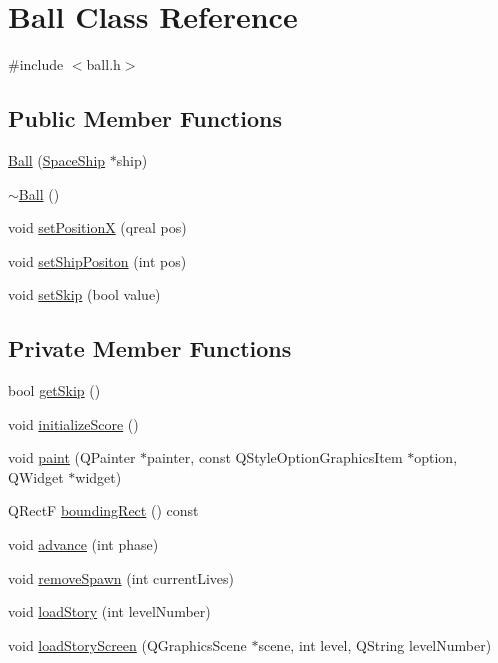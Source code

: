\hypertarget{class_ball}{
\section{Ball Class Reference}
\label{class_ball}
}


{\ttfamily \#include $<$ball.h$>$}\subsection*{Public Member Functions}
\begin{DoxyCompactItemize}
\item 
\hyperlink{class_ball_a30e61563c2285136d241396826967ca5}{Ball} (\hyperlink{class_space_ship}{SpaceShip} $\ast$ship)
\item 
\hyperlink{class_ball_a20f2f6ac0bf648f406a8e12e63429fcd}{$\sim$Ball} ()
\item 
void \hyperlink{class_ball_aacd6dd3f04beb5d6cb7b09b3b8b42dda}{setPositionX} (qreal pos)
\item 
void \hyperlink{class_ball_abcff8feb2c1c83085e07155a8aea088e}{setShipPositon} (int pos)
\item 
void \hyperlink{class_ball_af0419f8ca126be79df52185f51bec278}{setSkip} (bool value)
\end{DoxyCompactItemize}
\subsection*{Private Member Functions}
\begin{DoxyCompactItemize}
\item 
bool \hyperlink{class_ball_a016c7ea71cd5b999189b814dab4b96a3}{getSkip} ()
\item 
void \hyperlink{class_ball_a269f58ffac3a2ec3ad18be40df079816}{initializeScore} ()
\item 
void \hyperlink{class_ball_ac61500d8ef7bbb595175da04c323949c}{paint} (QPainter $\ast$painter, const QStyleOptionGraphicsItem $\ast$option, QWidget $\ast$widget)
\item 
QRectF \hyperlink{class_ball_ae68484e656a6c7a195e41185c06e9e8f}{boundingRect} () const 
\item 
void \hyperlink{class_ball_adc25aa6b771ad0bf296d10db4ebcd158}{advance} (int phase)
\item 
void \hyperlink{class_ball_a9da8ae4c7a2bd29919b8eae1ad5a3b1c}{removeSpawn} (int currentLives)
\item 
void \hyperlink{class_ball_a83e89d3d0787c7bb339014be48f6ff03}{loadStory} (int levelNumber)
\item 
void \hyperlink{class_ball_ad6e9abee09d5e6f9834071bd2045e312}{loadStoryScreen} (QGraphicsScene $\ast$scene, int level, QString levelNumber)
\end{DoxyCompactItemize}

